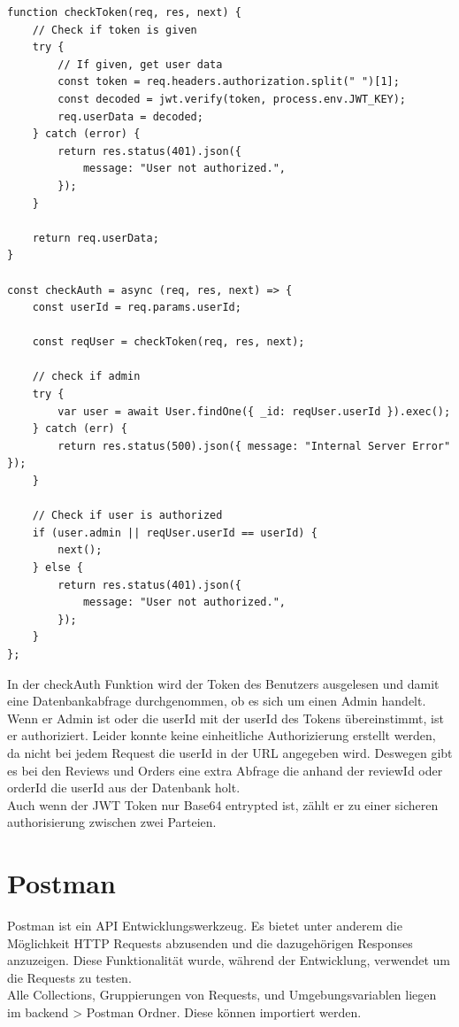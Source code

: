 \begin{lstlisting}[caption={Abfrage des Tokens (backend > api > middleware > check-auth.js)},label={lst:checktoken}]
function checkToken(req, res, next) {
    // Check if token is given
    try {
        // If given, get user data
        const token = req.headers.authorization.split(" ")[1];
        const decoded = jwt.verify(token, process.env.JWT_KEY);
        req.userData = decoded;
    } catch (error) {
        return res.status(401).json({
            message: "User not authorized.",
        });
    }

    return req.userData;
}

const checkAuth = async (req, res, next) => {
    const userId = req.params.userId;

    const reqUser = checkToken(req, res, next);

    // check if admin
    try {
        var user = await User.findOne({ _id: reqUser.userId }).exec();
    } catch (err) {
        return res.status(500).json({ message: "Internal Server Error" });
    }

    // Check if user is authorized
    if (user.admin || reqUser.userId == userId) {
        next();
    } else {
        return res.status(401).json({
            message: "User not authorized.",
        });
    }
};
\end{lstlisting}

In der checkAuth Funktion wird der Token des Benutzers ausgelesen und damit eine Datenbankabfrage durchgenommen, ob es sich um einen Admin handelt. Wenn er Admin ist oder die userId mit der userId des Tokens übereinstimmt, ist er authoriziert. Leider konnte keine einheitliche Authorizierung erstellt werden, da nicht bei jedem Request die userId in der URL angegeben wird. Deswegen gibt es bei den Reviews und Orders eine extra Abfrage die anhand der reviewId oder orderId die userId aus der Datenbank holt.\\
Auch wenn der JWT Token nur Base64 entrypted ist, zählt er zu einer sicheren authorisierung zwischen zwei Parteien.

\section{Postman}
Postman ist ein API Entwicklungswerkzeug. Es bietet unter anderem die Möglichkeit HTTP Requests abzusenden und die dazugehörigen Responses anzuzeigen. Diese Funktionalität wurde, während der Entwicklung, verwendet um die Requests zu testen.\\
Alle Collections, Gruppierungen von Requests, und Umgebungsvariablen liegen im backend > Postman Ordner. Diese können importiert werden.

